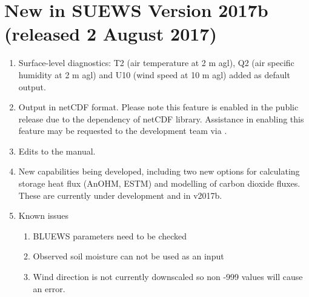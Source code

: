 \documentclass[letterpaper,10pt,english]{sphinxmanual}
\begin{document}
\section{New in SUEWS Version 2017b (released 2 August 2017)}
\label{\detokenize{version-history:new-in-suews-version-2017b-released-2-august-2017}}
\begin{enumerate}
\item {} 
Surface-level diagnostics: T2 (air temperature at 2 m agl), Q2 (air
specific humidity at 2 m agl) and U10 (wind speed at 10 m agl) added
as default output.

\item {} 
Output in netCDF format. Please note this feature is  enabled
in the public release due to the dependency of netCDF library.
Assistance in enabling this feature may be requested to the
development team via .

\item {} 
Edits to the manual.

\item {} 
New capabilities being developed, including two new options for
calculating storage heat flux (AnOHM, ESTM) and modelling of carbon
dioxide fluxes. These are currently under development and  in v2017b.

\item {} 
Known issues
\begin{enumerate}
\item {} 
BLUEWS parameters need to be checked

\item {} 
Observed soil moisture can not be used as an input

\item {} 
Wind direction is not currently downscaled so non -999 values will
cause an error.

\end{enumerate}

\end{enumerate}
\end{document}
